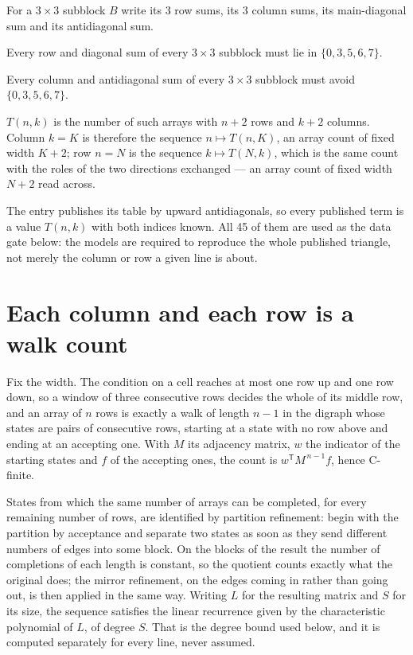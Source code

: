 \documentclass[11pt]{article}
\theoremstyle{definition}
\begin{document}
For a $3\times3$ subblock $B$ write its 3 row sums, its 3 column sums, its main-diagonal sum and its antidiagonal sum.

Every row and diagonal sum of every $3\times3$ subblock must lie in $\{0, 3, 5, 6, 7\}$.

Every column and antidiagonal sum of every $3\times3$ subblock must avoid $\{0, 3, 5, 6, 7\}$.

$T(n,k)$ is the number of such arrays with $n + 2$ rows and $k + 2$ columns. Column $k = K$ is therefore the sequence $n \mapsto T(n,K)$, an array count of fixed width $K + 2$; row $n = N$ is the sequence $k \mapsto T(N,k)$, which is the same count with the roles of the two directions exchanged --- an array count of fixed width $N + 2$ read across.

The entry publishes its table by upward antidiagonals, so every published term is a value $T(n,k)$ with both indices known. All 45 of them are used as the data gate below: the models are required to reproduce the whole published triangle, not merely the column or row a given line is about.

\section{Each column and each row is a walk count}

Fix the width. The condition on a cell reaches at most one row up and one row down, so a window of three consecutive rows decides the whole of its middle row, and an array of $n$ rows is exactly a walk of length $n-1$ in the digraph whose states are pairs of consecutive rows, starting at a state with no row above and ending at an accepting one. With $M$ its adjacency matrix, $w$ the indicator of the starting states and $f$ of the accepting ones, the count is $w^{\mathsf T}M^{\,n-1}f$, hence C-finite.

States from which the same number of arrays can be completed, for every remaining number of rows, are identified by partition refinement: begin with the partition by acceptance and separate two states as soon as they send different numbers of edges into some block. On the blocks of the result the number of completions of each length is constant, so the quotient counts exactly what the original does; the mirror refinement, on the edges coming in rather than going out, is then applied in the same way. Writing $L$ for the resulting matrix and $S$ for its size, the sequence satisfies the linear recurrence given by the characteristic polynomial of $L$, of degree $S$. That is the degree bound used below, and it is computed separately for every line, never assumed.
\end{document}
